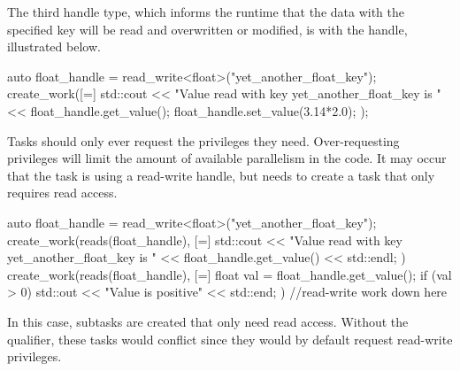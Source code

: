 The third handle type, which informs the runtime that the data with the specified key will be read and overwritten or modified, 
is with the  handle, illustrated below. 
\begin{CppCode}
auto float_handle = read_write<float>("yet_another_float_key");
create_work([=] {
  std::cout << "Value read with key yet_another_float_key is " 
          << float_handle.get_value();
  float_handle.set_value(3.14*2.0);
});
\end{CppCode}

Tasks should only ever request the privileges they need. 
Over-requesting privileges will limit the amount of available parallelism in the code.
It may occur that the task is using a read-write handle, but needs to create a
task that only requires read access.

\begin{CppCode}
auto float_handle = read_write<float>("yet_another_float_key");
create_work(reads(float_handle), [=] {
  std::cout << "Value read with key yet_another_float_key is " 
          << float_handle.get_value() << std::endl;
})
create_work(reads(float_handle), [=] {
  float val = float_handle.get_value();
  if (val > 0) std::out << "Value is positive" << std::end;
})
//read-write work down here
\end{CppCode}
In this case, subtasks are created that only need read access. 
Without the  qualifier, these tasks would conflict since they
would by default request read-write privileges.

